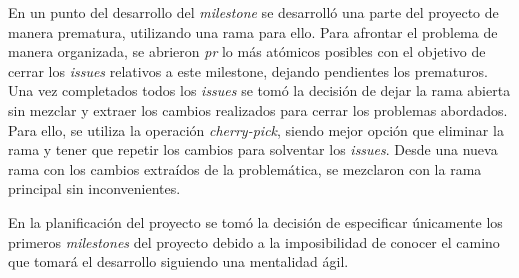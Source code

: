 En un punto del desarrollo del \emph{\gls{milestone}} se desarrolló una parte del proyecto de manera prematura, utilizando una rama para ello. Para afrontar el problema de manera organizada, se abrieron \emph{\gls{pr}} lo más atómicos posibles con el objetivo de cerrar los \emph{\glspl{issue}} relativos a este milestone, dejando pendientes los prematuros. Una vez completados todos los \emph{\glspl{issue}} se tomó la decisión de dejar la rama abierta sin mezclar y extraer los cambios realizados para cerrar los problemas abordados. Para ello, se utiliza la operación \emph{cherry-pick}, siendo mejor opción que eliminar la rama y tener que repetir los cambios para solventar los \emph{\glspl{issue}}. Desde una nueva rama con los cambios extraídos de la problemática, se mezclaron con la rama principal sin inconvenientes.

En la planificación del proyecto se tomó la decisión de especificar únicamente los primeros \emph{\glspl{milestone}} del proyecto debido a la imposibilidad de conocer el camino que tomará el desarrollo siguiendo una mentalidad ágil.